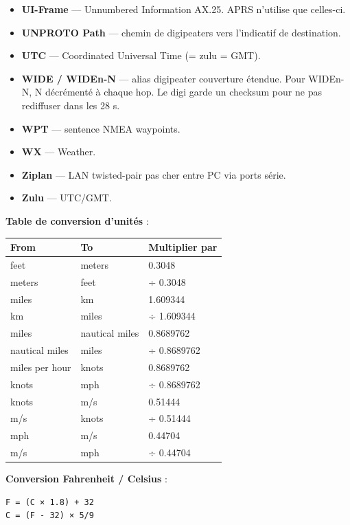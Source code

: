 {\begin{itemize}
  \textbf{Tunneling} --- transport de trafic AX.25 APRS via réseau
  tiers.
\item
  \textbf{UI-Frame} --- Unnumbered Information AX.25. APRS n'utilise que
  celles-ci.
\item
  \textbf{UNPROTO Path} --- chemin de digipeaters vers l'indicatif de
  destination.
\item
  \textbf{UTC} --- Coordinated Universal Time (= zulu = GMT).
\item
  \textbf{WIDE / WIDEn-N} --- alias digipeater couverture étendue. Pour
  WIDEn-N, N décrémenté à chaque hop. Le digi garde un checksum pour ne
  pas rediffuser dans les 28 s.
\item
  \textbf{WPT} --- sentence NMEA waypoints.
\item
  \textbf{WX} --- Weather.
\item
  \textbf{Ziplan} --- LAN twisted-pair pas cher entre PC via ports
  série.
\item
  \textbf{Zulu} --- UTC/GMT.
\end{itemize}

\textbf{Table de conversion d'unités} :

\begin{longtable}[]{@{}lll@{}}
\toprule\noalign{}
From & To & Multiplier par \\
\midrule\noalign{}
\endhead
\bottomrule\noalign{}
\endlastfoot
feet & meters & 0.3048 \\
meters & feet & ÷ 0.3048 \\
miles & km & 1.609344 \\
km & miles & ÷ 1.609344 \\
miles & nautical miles & 0.8689762 \\
nautical miles & miles & ÷ 0.8689762 \\
miles per hour & knots & 0.8689762 \\
knots & mph & ÷ 0.8689762 \\
knots & m/s & 0.51444 \\
m/s & knots & ÷ 0.51444 \\
mph & m/s & 0.44704 \\
m/s & mph & ÷ 0.44704 \\
\end{longtable}

\textbf{Conversion Fahrenheit / Celsius} :

\begin{verbatim}
F = (C × 1.8) + 32
C = (F - 32) × 5/9
\end{verbatim}
}

